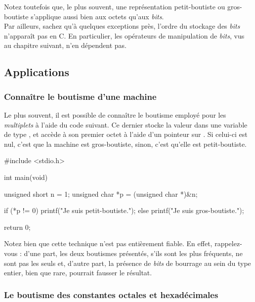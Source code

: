 \begin{infobox}
  Notez toutefois que, le plus souvent,
une représentation petit-boutiste ou gros-boutiste s'applique aussi bien
aux octets qu'aux \emph{bits}.\\
\textbar{} Par ailleurs, sachez qu'à quelques exceptions près, l'ordre
du stockage des \emph{bits} n'apparaît pas en C. En particulier, les
opérateurs de manipulation de \emph{bits}, vus au chapitre suivant, n'en
dépendent pas.
\end{infobox}


\subsection{Applications}
\label{applications-1}

\subsubsection{Connaître le boutisme d'une machine}
\label{connaitre-le-boutisme-dune-machine}

Le plus souvent, il est possible de connaître le boutisme employé pour
les \emph{multiplets} à l'aide du code suivant. Ce dernier stocke la
valeur  dans une variable de type , et
accède à son premier octet à l'aide d'un pointeur sur
. Si celui-ci est nul, c'est que la machine est
gros-boutiste, sinon, c'est qu'elle est petit-boutiste.

\begin{C}
#include <stdio.h>


int main(void)
{
    unsigned short n = 1;
    unsigned char *p = (unsigned char *)&n;

    if (*p != 0)
        printf("Je suis petit-boutiste.\n");
    else
        printf("Je suis gros-boutiste.\n");

    return 0;
}
\end{C}

\begin{attentionbox}
  Notez bien que cette technique n'est
pas entièrement fiable. En effet, rappelez-vous : d'une part, les deux
boutismes présentés, s'ils sont les plus fréquents, ne sont pas les
seuls et, d'autre part, la présence de \emph{bits} de bourrage au sein
du type entier, bien que rare, pourrait fausser le résultat.
\end{attentionbox}


\subsubsection{Le boutisme des constantes octales et hexadécimales}
\label{le-boutisme-des-constantes-octales-et-hexadecimales}

